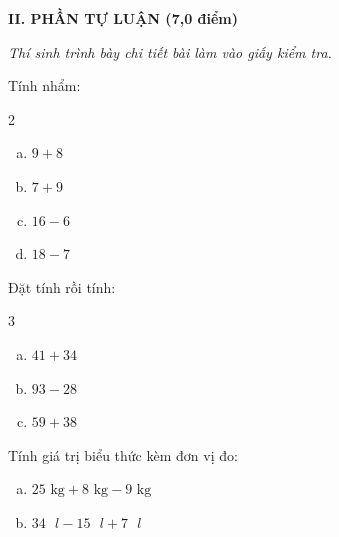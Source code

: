 \vspace{4mm}
\textbf{\large II. PHẦN TỰ LUẬN (7,0 điểm)}

{\itshape Thí sinh trình bày chi tiết bài làm vào giấy kiểm tra.}

\begin{bt}[1,0 điểm]
Tính nhẩm:
\begin{multicols}{2}
\begin{enumerate}[a)]
  \item $9 + 8$
  \item $7 + 9$
  \item $16 - 6$
  \item $18 - 7$
\end{enumerate}
\end{multicols}
\end{bt}

\begin{bt}[1,5 điểm]
Đặt tính rồi tính:
\begin{multicols}{3}
\begin{enumerate}[a)]
  \item $41 + 34$
  \item $93 - 28$
  \item $59 + 38$
\end{enumerate}
\end{multicols}
\end{bt}

\begin{bt}[1,0 điểm]
Tính giá trị biểu thức kèm đơn vị đo:
\begin{enumerate}[a)]
  \item $25\text{ kg} + 8\text{ kg} - 9\text{ kg}$
  \item $34\text{ }l - 15\text{ }l + 7\text{ }l$
\end{enumerate}
\end{bt}

